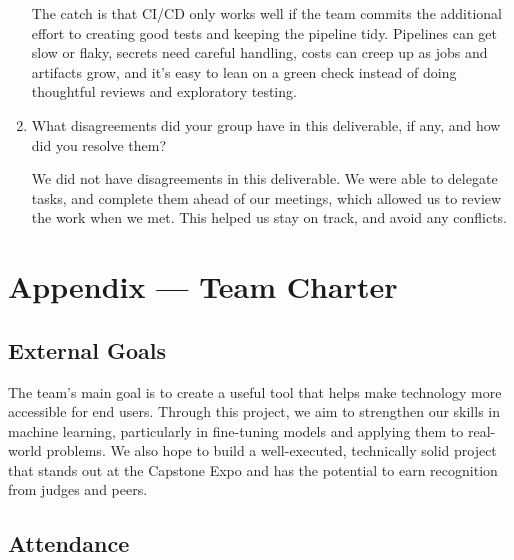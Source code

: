 \documentclass{article}
\begin{document}
\begin{enumerate}
The catch is that CI/CD only works well if the team commits the additional effort to creating good tests and keeping the pipeline tidy. Pipelines can get slow or flaky, secrets need careful handling, costs can creep up as jobs and artifacts grow, and it’s easy to lean on a green check instead of doing thoughtful reviews and exploratory testing.

    \item What disagreements did your group have in this deliverable, if any,
    and how did you resolve them?

    We did not have disagreements in this deliverable. We were able to delegate tasks, and complete them ahead of our meetings, which allowed us to review the work when we met. This helped us stay on track, and avoid any conflicts. 
\end{enumerate}

\newpage{}

\section*{Appendix --- Team Charter}



\subsection*{External Goals}

\begin{comment}
\wss{What are your team's external goals for this project? These are not the
goals related to the functionality or quality fo the project.  These are the
goals on what the team wishes to achieve with the project.  Potential goals are
to win a prize at the Capstone EXPO, or to have something to talk about in
interviews, or to get an A+, etc.}
\end{comment}
The team's main goal is to create a useful tool that helps make technology more accessible for end users. Through this project, we aim to strengthen our skills in machine learning, particularly in fine-tuning models and applying them to real-world problems. We also hope to build a well-executed, technically solid project that stands out at the Capstone Expo and has the potential to earn recognition from judges and peers.

\subsection*{Attendance}
\end{document}
